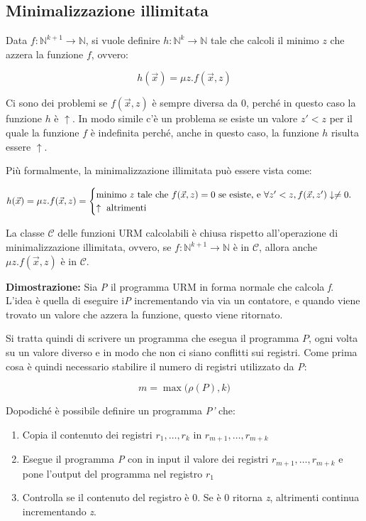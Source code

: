 \subsection{Minimalizzazione illimitata}\label{ex:minima}

Data $f : \mathbb{N}^{k+1} \rightarrow \mathbb{N}$, si vuole definire $h : \mathbb{N}^{k} \rightarrow \mathbb{N}$ tale che calcoli il minimo $z$ che azzera la funzione $f$, ovvero:

$$
h(\vec{x}) = \mu z . f(\vec{x},z)
$$

Ci sono dei problemi se $f(\vec{x},z)$ è sempre diversa da 0, perché in questo caso la funzione $h$ è $\uparrow$. In modo simile c'è un problema se esiste un valore $z' < z$ per il quale la funzione $f$ è indefinita perché, anche in questo caso, la funzione $h$ risulta essere $\uparrow$.

Più formalmente, la minimalizzazione illimitata può essere vista come:

$$
h(\vec{x}) = \mu z.f(\vec{x},z) = \begin{cases}
\text{minimo \textit{z} tale che }f(\vec{x},z) = 0 \text{ se esiste, e }\forall z' < z, f(\vec{x}, z') \downarrow \neq 0. \\
\uparrow \text{ altrimenti}
\end{cases}
$$

La classe $\mathcal{C}$ delle funzioni URM calcolabili è chiusa rispetto all'operazione di minimalizzazione illimitata, ovvero, se $f : \mathbb{N}^{k+1} \rightarrow \mathbb{N}$ è in $\mathcal{C}$, allora anche $\mu z . f(\vec{x},z)$ è in $\mathcal{C}$.

\textbf{Dimostrazione:} Sia \textit{P} il programma URM in forma normale che calcola \textit{f}. L'idea è quella di eseguire i\textit{P} incrementando via via un contatore, e quando viene trovato un valore che azzera la funzione, questo viene ritornato.

Si tratta quindi di scrivere un programma che esegua il programma $P$, ogni volta su un valore diverso e in modo che non ci siano conflitti sui registri. Come prima cosa è quindi necessario stabilire il numero di registri utilizzato da \textit{P}:

$$
m = \max\big(\rho(P), k\big)
$$

Dopodiché è possibile definire un programma \textit{P'} che:

\begin{enumerate}
	\item Copia il contenuto dei registri $r_1, \ldots, r_k$ in $r_{m+1}, \ldots, r_{m+k}$
	\item Esegue il programma \textit{P} con in input il valore dei registri $r_{m+1}, \ldots, r_{m+k}$ e pone l'output del programma nel registro $r_1$
	\item Controlla se il contenuto del registro è 0. Se è 0 ritorna \textit{z}, altrimenti continua incrementando \textit{z}.
\end{enumerate}

